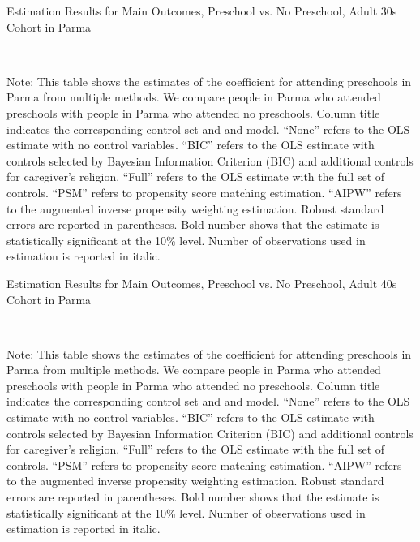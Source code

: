 \begin{table}[H] \caption{Estimation Results for Main Outcomes, Preschool vs. No Preschool, Adult 30s Cohort in Parma} \label{ols-M-adult30-reg-pres-parma}
\scalebox{0.7}{}
\vspace{1ex} \\
\footnotesize\raggedright{Note: This table shows the estimates of the coefficient for attending preschools in Parma from multiple methods. We compare people in Parma who attended preschools with people in Parma who attended no preschools. Column title indicates the corresponding control set and and model. ``None'' refers to the OLS estimate with no control variables. ``BIC'' refers to the OLS estimate with controls selected by Bayesian Information Criterion (BIC) and additional controls for caregiver's religion. ``Full'' refers to the OLS estimate with the full set of controls. ``PSM'' refers to propensity score matching estimation. ``AIPW'' refers to the augmented inverse propensity weighting estimation. Robust standard errors are reported in parentheses. Bold number shows that the estimate is statistically significant at the 10\% level. Number of observations used in estimation is reported in italic.}

\end{table}




\begin{table}[H] \caption{Estimation Results for Main Outcomes, Preschool vs. No Preschool, Adult 40s Cohort in Parma} \label{ols-M-adult40-reg-pres-parma}
\scalebox{0.7}{}
\vspace{1ex} \\
\footnotesize\raggedright{Note: This table shows the estimates of the coefficient for attending preschools in Parma from multiple methods. We compare people in Parma who attended preschools with people in Parma who attended no preschools. Column title indicates the corresponding control set and and model. ``None'' refers to the OLS estimate with no control variables. ``BIC'' refers to the OLS estimate with controls selected by Bayesian Information Criterion (BIC) and additional controls for caregiver's religion. ``Full'' refers to the OLS estimate with the full set of controls. ``PSM'' refers to propensity score matching estimation. ``AIPW'' refers to the augmented inverse propensity weighting estimation. Robust standard errors are reported in parentheses. Bold number shows that the estimate is statistically significant at the 10\% level. Number of observations used in estimation is reported in italic.}

\end{table}




